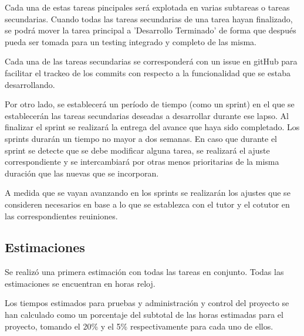 \documentclass[a4paper]{article}
\begin{document}
Cada una de estas tareas pincipales será explotada en varias subtareas o tareas secundarias. Cuando todas las tareas secundarias de una tarea hayan finalizado, se podrá mover la tarea principal a 'Desarrollo Terminado' de forma que después pueda ser tomada para un testing integrado y completo de las misma.

Cada una de las tareas secundarias se corresponderá con un issue en gitHub para facilitar el trackeo de los commits con respecto a la funcionalidad que se estaba desarrollando.

Por otro lado, se establecerá un período de tiempo (como un sprint) en el que se establecerán las tareas secundarias deseadas a desarrollar durante ese lapso. Al finalizar el sprint se realizará la entrega del avance que haya sido completado. Los sprints durarán un tiempo no mayor a dos semanas. En caso que durante el sprint se detecte que se debe modificar alguna tarea, se realizará el ajuste correspondiente y se intercambiará por otras menos prioritarias de la misma duración que las nuevas que se incorporan.

A medida que se vayan avanzando en los sprints se realizarán los ajustes que se consideren necesarios en base a lo que se establezca con el tutor y el cotutor en las correspondientes reuiniones.

\subsection{Estimaciones}

Se realizó una primera estimación con todas las tareas en conjunto. Todas las estimaciones se encuentran en horas reloj.

Los tiempos estimados para pruebas y administración y control del proyecto se han calculado como un porcentaje del subtotal de las horas estimadas para el proyecto, tomando el 20\% y el 5\% respectivamente para cada uno de ellos.
\end{document}

